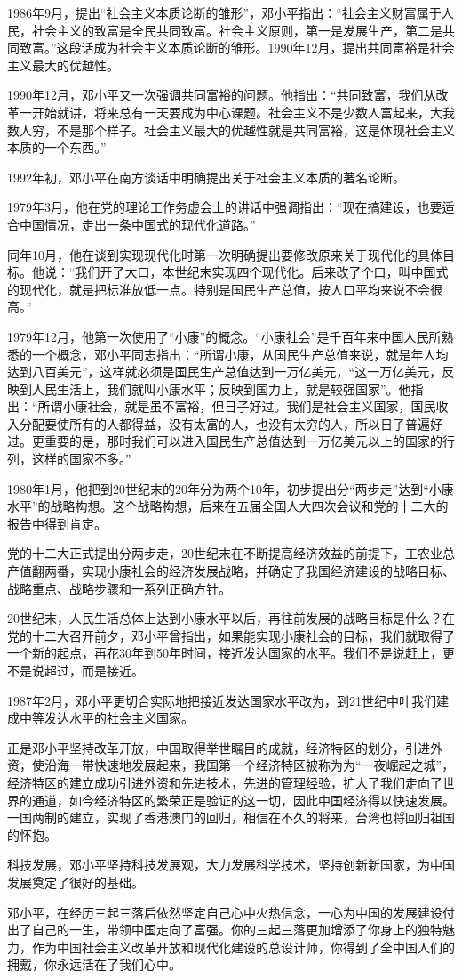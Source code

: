 \documentclass[cs4size,a4paper,nofonts]{ctexart}
\begin{document}
1986年9月，提出“社会主义本质论断的雏形”，邓小平指出：“社会主义财富属于人民，社会主义的致富是全民共同致富。社会主义原则，第一是发展生产，第二是共同致富。”这段话成为社会主义本质论断的雏形。1990年12月，提出共同富裕是社会主义最大的优越性。

1990年12月，邓小平又一次强调共同富裕的问题。他指出：“共同致富，我们从改革一开始就讲，将来总有一天要成为中心课题。社会主义不是少数人富起来，大我数人穷，不是那个样子。社会主义最大的优越性就是共同富裕，这是体现社会主义本质的一个东西。”

1992年初，邓小平在南方谈话中明确提出关于社会主义本质的著名论断。

1979年3月，他在党的理论工作务虚会上的讲话中强调指出：“现在搞建设，也要适合中国情况，走出一条中国式的现代化道路。”

同年10月，他在谈到实现现代化时第一次明确提出要修改原来关于现代化的具体目标。他说：“我们开了大口，本世纪末实现四个现代化。后来改了个口，叫中国式的现代化，就是把标准放低一点。特别是国民生产总值，按人口平均来说不会很高。”

1979年12月，他第一次使用了“小康”的概念。“小康社会”是千百年来中国人民所熟悉的一个概念，邓小平同志指出：“所谓小康，从国民生产总值来说，就是年人均达到八百美元”，这样就必须是国民生产总值达到一万亿美元，“这一万亿美元，反映到人民生活上，我们就叫小康水平；反映到国力上，就是较强国家”。他指出：“所谓小康社会，就是虽不富裕，但日子好过。我们是社会主义国家，国民收入分配要使所有的人都得益，没有太富的人，也没有太穷的人，所以日子普遍好过。更重要的是，那时我们可以进入国民生产总值达到一万亿美元以上的国家的行列，这样的国家不多。”

1980年1月，他把到20世纪末的20年分为两个10年，初步提出分“两步走”达到“小康水平”的战略构想。这个战略构想，后来在五届全国人大四次会议和党的十二大的报告中得到肯定。

党的十二大正式提出分两步走，20世纪末在不断提高经济效益的前提下，工农业总产值翻两番，实现小康社会的经济发展战略，并确定了我国经济建设的战略目标、战略重点、战略步骤和一系列正确方针。

20世纪末，人民生活总体上达到小康水平以后，再往前发展的战略目标是什么？在党的十二大召开前夕，邓小平曾指出，如果能实现小康社会的目标，我们就取得了一个新的起点，再花30年到50年时间，接近发达国家的水平。我们不是说赶上，更不是说超过，而是接近。

1987年2月，邓小平更切合实际地把接近发达国家水平改为，到21世纪中叶我们建成中等发达水平的社会主义国家。

正是邓小平坚持改革开放，中国取得举世瞩目的成就，经济特区的划分，引进外资，使沿海一带快速地发展起来，我国第一个经济特区被称为为“一夜崛起之城”，经济特区的建立成功引进外资和先进技术，先进的管理经验，扩大了我们走向了世界的通道，如今经济特区的繁荣正是验证的这一切，因此中国经济得以快速发展。
一国两制的建立，实现了香港澳门的回归，相信在不久的将来，台湾也将回归祖国的怀抱。

科技发展，邓小平坚持科技发展观，大力发展科学技术，坚持创新新国家，为中国发展奠定了很好的基础。

邓小平，在经历三起三落后依然坚定自己心中火热信念，一心为中国的发展建设付出了自己的一生，带领中国走向了富强。你的三起三落更加增添了你身上的独特魅力，作为中国社会主义改革开放和现代化建设的总设计师，你得到了全中国人们的拥戴，你永远活在了我们心中。

\end{document}
